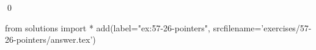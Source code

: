
\begin{ex}
  \label{ex:57-26-pointers}
  
  \qed
\end{ex}
\begin{python0}
from solutions import *
add(label="ex:57-26-pointers",
    srcfilename='exercises/57-26-pointers/answer.tex')
\end{python0}
